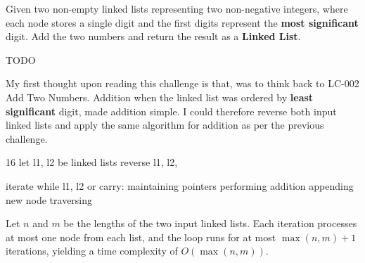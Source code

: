 
\label{prob:lc-445-add-two-numbers-2}

\ProblemSummary
Given two non-empty linked lists representing two non-negative integers, where each node
stores a single digit and the first digits represent the \textbf{most significant} digit.
Add the two numbers and return the result as a \textbf{Linked List}.

 
\KeyIdea
TODO

\begin{Thinking}
My first thought upon reading this challenge is that, was to think back to LC-002 Add Two Numbers. 
Addition when the linked list was ordered by \textbf{least significant} digit, made addition simple. 
I could therefore reverse both input linked lists and apply the same algorithm for addition as per the previous challenge.
\end{Thinking}

\Algorithm
\begin{CodeBlock}[style=pseudo,caption={Pseudocode}]{16}
    let l1, l2 be linked lists
    reverse l1, l2,

    iterate while l1, l2 or carry:
      maintaining pointers
      performing addition
      appending new node
      traversing

\end{CodeBlock}


\Correctness


\Complexity
Let $n$ and $m$ be the lengths of the two input linked lists.
Each iteration processes at most one node from each list, and the loop runs for
at most $\max(n, m) + 1$ iterations, yielding a time complexity of
$O(\max(n, m))$.

